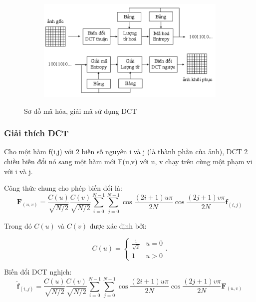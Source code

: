 \begin{figure}
    \begin{subfigure}{0.8\textwidth}
        \includegraphics[width=1.0\linewidth]{Chapters/items/DCT.jpg}
         
        \label{fig: dct}
    \end{subfigure}
    \caption{Sơ đồ mã hóa, giải mã sử dụng DCT}
\end{figure}

\subsubsection{Giải thích DCT}
Cho một hàm f(i,j) với 2 biến số nguyên i và j (là thành phần của ảnh),
DCT 2 chiều biến đổi nó sang một hàm mới F(u,v) với u, v chạy trên
cùng một phạm vi với i và j.

Công thức chung cho phép biến đổi là:
\begin{equation*}
    \mathbf{F}_{(u,v)} = \frac{C(u)}{\sqrt{N/2}} \frac{C(v)}{\sqrt{N/2}} \sum_{i=0}^{N-1} \sum_{j=0}^{N-1}  \cos \frac{(2i+1)u\pi}{2N} \cos\frac{(2j+1)v\pi}{2N} \mathbf{f}_{(i,j)}
\end{equation*}

Trong đó ${C(u)}$ và ${C(v)}$ được xác định bởi:

\begin{equation*}
    C(u) = \begin{cases} \frac{1}{\sqrt{2}} & u = 0 \\ 1 & u>0 \end{cases}\text{.}
\end{equation*}

Biến đổi DCT nghịch:
\begin{equation*}
    \mathbf{\tilde{f}}_{(i,j)} = \frac{C(u)}{\sqrt{N/2}} \frac{C(v)}{\sqrt{N/2}} \sum_{i=0}^{N-1} \sum_{j=0}^{N-1}  \cos \frac{(2i+1)u\pi}{2N} \cos\frac{(2j+1)v\pi}{2N} \mathbf{F}_{(u,v)}
\end{equation*}

